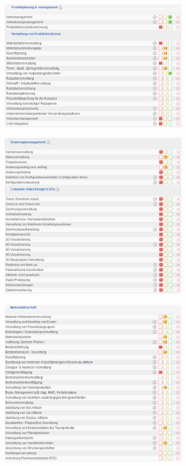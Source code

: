 \documentclass[12pt]{article}
\begin{document}
\noindent
\begin{figure}[here!]
\centering
\includegraphics[width=0.7\textwidth]{images/tr17}
\end{figure}\FloatBarrier
\noindent
\begin{figure}[here!]
\centering
\includegraphics[width=0.7\textwidth]{images/tr18}
\end{figure}\FloatBarrier
\noindent
\begin{figure}[here!]
\centering
\includegraphics[width=0.7\textwidth]{images/tr19}
\end{figure}\FloatBarrier
\end{document}
